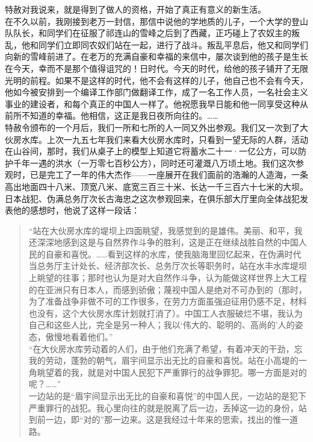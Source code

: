 特赦对我说来，就是得到了做人的资格，开始了真正有意义的新生活。\\

在不久以前，我刚接到老万一封信，那信中说他的学地质的儿子，一个大学的登山队队长，和同学们在征服了祁连山的雪峰之后到了西藏，正巧碰上了农奴主的叛乱，他和同学们立即同农奴们站在一起，进行了战斗。叛乱平息后，他又和同学们向新的雪峰前进了。在老万的充满自豪和幸福的来信中，屡次谈到他的孩子是生长在今天，幸而不是那个值得诅咒的！日时代。今天的时代，给他的孩子铺开了无限光明的前程。如果不是这样的时代，他不会有这样的儿子，他自己也不会有今天，他如今被安排到一个编译工作部门做翻译工作，成了一名工作人员，一名社会主义事业的建设者，和每个真正的中国人一样了。他祝愿我早日能和他一同享受这种从前所不知道的幸福。他相信，这正是我日夜所向往的。……\\

特赦令颁布的一个月后，我们一所和七所的人一同又外出参观。我们又一次到了大伙房水库。上次一九五七年我们来看大伙房水库时，只看到一望无际的人群，活动在山谷间，那时，我们从桌子上的模型上知道它将蓄水二十一·一亿公方，可以防护千年一遇的洪水（一万零七百秒公方），同时还可灌溉八万顷土地。我们这次参观时，已是完工了一年的伟大杰作——一座展开在我们面前的浩瀚的人造海，一条高出地面四十八米、顶宽八米、底宽三百三十米、长达一千三百六十七米的大坝。日本战犯、伪满总务厅次长古海忠之这次参观回来，在俱乐部大厅里向全体战犯发表他的感想时，他说了这样一段话：\\

\begin{quote}
	“站在大伙房水库的堤坝上四面眺望，我感觉到的是雄伟。美丽、和平，我还深深地感到这是与自然界作斗争的胜利，这是正在继续战胜自然的中国人民的自豪和喜悦。……看到这样的水库，使我脑海里回忆起来，在伪满时代当总务厅主计处长、经济部次长、总务厅次长等职务时，站在水丰水库堤坝上眺望的往事；那时也认为是对大自然作斗争，认为能做这样世界上大工程的在亚洲只有日本人，而感到骄傲；蔑视中国人是绝对不可办到的（那时，为了准备战争非做不可的工作很多，在劳力方面虽强迫征用仍感不足，材料也没有，这个大伙房水库计划就打消了）。中国工人衣服破烂不堪，我认为自己和这些人比，完全是另一种人；我以‘伟大的、聪明的、高尚的’人的姿态，傲慢地看着他们。”\\

“在大伙房水库劳动着的人们，由于他们充满了希望，有着冲天的干劲，忘我的劳动，蓬勃的朝气，眉宇间显示出无比的自豪和喜悦。站在小高堤的一角眺望着的我，就是对中国人民犯下严重罪行的战争罪犯。哪一方面是对的呢？……”\\

一边站的是“眉宇间显示出无比的自豪和喜悦”的中国人民，一边站的是犯下严重罪行的战犯。我心里向往的就是脱离了后一边，丢掉这一边的身份，站到前一边，即“对的”那一边来。这是我经过十年来的思索，找出的惟一道路。\\
\end{quote}

